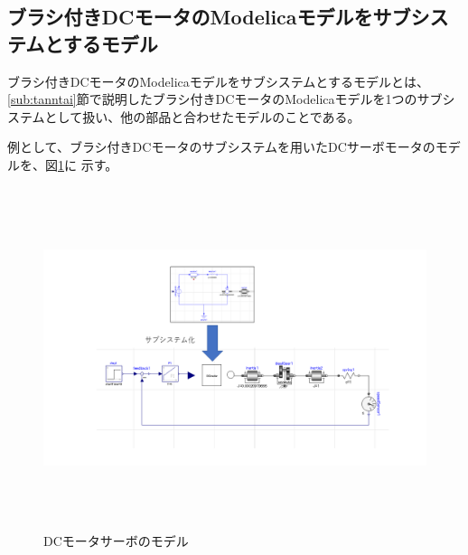 

\subsection{ブラシ付きDCモータのModelicaモデルをサブシステムとするモデル} \label{sub:submodel}
ブラシ付きDCモータのModelicaモデルをサブシステムとするモデルとは、
\ref{sub:tanntai}節で説明したブラシ付きDCモータのModelicaモデルを1つのサブシステムとして扱い、他の部品と合わせたモデルのことである。

例として、ブラシ付きDCモータのサブシステムを用いたDCサーボモータのモデルを、図\ref{fig:submodel}に
示す。

\begin{figure}[t]
	\centering
	\includegraphics[width=16.5cm,height=10cm]{./Image/submodel_pack.png}
	\caption{DCモータサーボのモデル}
	\label{fig:submodel}
  \end{figure}


